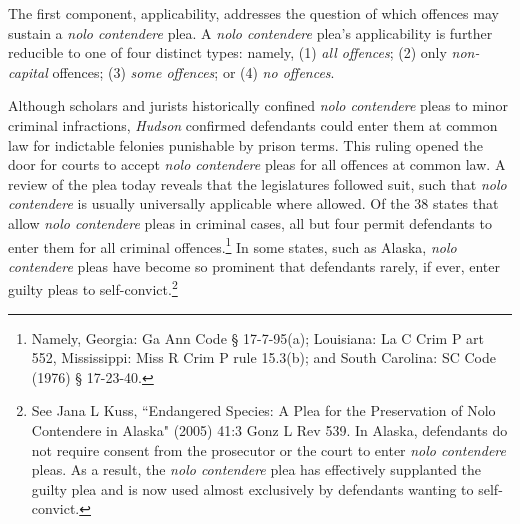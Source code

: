 The first component, applicability, addresses the question of which offences may sustain a \textit{nolo contendere} plea. A \textit{nolo contendere} plea's applicability is further reducible to one of four distinct types: namely, (1) \textit{all offences}; (2) only \textit{non-capital} offences; (3) \textit{some offences}; or (4) \textit{no offences}. 

Although scholars and jurists historically confined \textit{nolo contendere} pleas to minor criminal infractions, \textit{Hudson} confirmed defendants could enter them at common law for indictable felonies punishable by prison terms. This ruling opened the door for courts to accept \textit{nolo contendere} pleas for all offences at common law. A review of the plea today reveals that the legislatures followed suit, such that \textit{nolo contendere} is usually universally applicable where allowed. Of the 38 states that allow \textit{nolo contendere} pleas in criminal cases, all but four permit defendants to enter them for all criminal offences.\footnote{Namely, Georgia: Ga Ann Code § 17-7-95(a); Louisiana: La C Crim P art 552, Mississippi: Miss R Crim P rule 15.3(b); and South Carolina: SC Code (1976) § 17-23-40.} In some states, such as Alaska, \textit{nolo contendere} pleas have become so prominent that defendants rarely, if ever, enter guilty pleas to self-convict.\footnote{See Jana L Kuss, ``Endangered Species: A Plea for the Preservation of Nolo Contendere in
Alaska" (2005) 41:3 Gonz L Rev 539. In Alaska, defendants do not require consent from the prosecutor or the court to enter \textit{nolo contendere} pleas. As a result, the \textit{nolo contendere} plea has effectively supplanted the guilty plea and is now used almost exclusively by defendants wanting to self-convict.}

